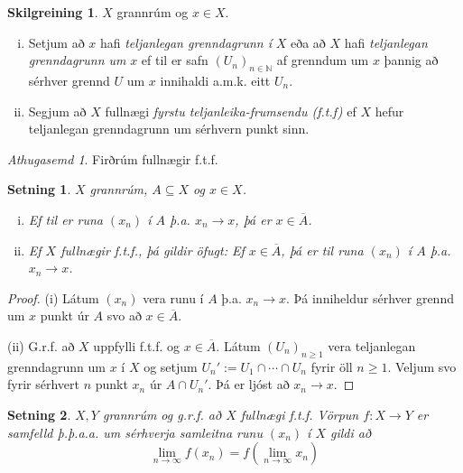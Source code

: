 \documentclass[a4paper,icelandic]{book}
\theoremstyle{definition}
\newtheorem{skilgr}{Skilgreining}[section]
\theoremstyle{plain}
\newtheorem{setn}{Setning}[section]
\theoremstyle{remark}
\newtheorem*{ath}{Athugasemd}
\newcommand{\N}{\mathbb{N}} %
\begin{document}
\begin{skilgr}
  $X$ grannrúm og $x\in X$. 
  \begin{enumerate}[(i)]
    \item Setjum að $x$ hafi \emph{teljanlegan grenndagrunn í} $X$ eða að $X$ hafi \emph{teljanlegan grenndagrunn um}
      $x$ ef til er safn $(U_n)_{n\in\N}$ af grenndum um $x$ þannig að sérhver
      grennd $U$ um $x$ innihaldi a.m.k. eitt $U_n$.
    \item Segjum að $X$ fullnægi \emph{fyrstu teljanleika-frumsendu
      (f.t.f)} ef $X$ hefur
      teljanlegan grenndagrunn um sérhvern punkt sinn.
  \end{enumerate}
\end{skilgr}
\begin{ath}
  Firðrúm fullnægir f.t.f.
\end{ath}
\begin{setn}
  $X$ grannrúm, $A\subseteq X$ og $x\in X$.
  \begin{enumerate}[(i)]
    \item Ef til er runa $(x_n)$ í $A$ þ.a. $x_n\longrightarrow x$, þá er
      $x\in\overline A$.
    \item Ef $X$ fullnægir f.t.f., þá gildir öfugt: Ef $x\in\overline A$, þá er
      til runa $(x_n)$ í $A$ þ.a. $x_n\longrightarrow x$. 
  \end{enumerate}
\end{setn}
\begin{proof}
  (i) Látum $(x_n)$ vera runu í $A$ þ.a. $x_n\longrightarrow x$. Þá inniheldur
  sérhver grennd um $x$ punkt úr $A$ svo að $x\in\overline A$.

  (ii) G.r.f. að $X$ uppfylli f.t.f. og $x\in\overline A$. Látum
  $(U_n)_{n\geq 1}$ vera teljanlegan grenndagrunn um $x$ í $X$ og setjum
  $U_n' := U_1\cap\cdots\cap U_n$ fyrir öll $n\geq 1$. Veljum svo fyrir sérhvert
  $n$ punkt $x_n$ úr $A\cap U_n'$. Þá er ljóst að $x_n\longrightarrow x$.
\end{proof}
\begin{setn}
  $X,Y$ grannrúm og g.r.f. að $X$ fullnægi f.t.f. Vörpun $f:X\to Y$ er samfelld
  \emph{þ.þ.a.a.} um sérhverja samleitna runu $(x_n)$ í $X$ gildi að
  \begin{equation}
    \lim_{n\to\infty}f(x_n) = f\left(\lim_{n\to\infty}x_n\right)
    \label{eq:ftf_limit}
  \end{equation}
\end{setn}
\end{document}
